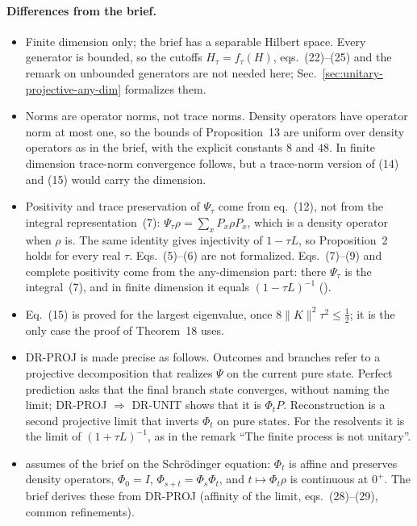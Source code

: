 \documentclass[11pt]{article}
\begin{document}
\paragraph{Differences from the brief.}
\begin{itemize}
\item Finite dimension only; the brief has a separable Hilbert space. Every generator is bounded,
  so the cutoffs $H_\tau = f_\tau(H)$, eqs.~(22)--(25) and the remark on unbounded generators are
  not needed here; Sec.~\ref{sec:unitary-projective-any-dim} formalizes them.
\item Norms are operator norms, not trace norms. Density operators have operator norm at most one,
  so the bounds of Proposition~13 are uniform over density operators as in the brief, with the
  explicit constants $8$ and $48$. In finite dimension trace-norm convergence follows, but a
  trace-norm version of (14) and (15) would carry the dimension.
\item Positivity and trace preservation of $\Psi_\tau$ come from eq.~(12), not from the integral
  representation~(7): $\Psi_\tau\rho = \sum_x P_x\rho P_x$, which is a density operator when
  $\rho$ is. The same identity gives injectivity of $1 - \tau L$, so Proposition~2 holds for
  every real $\tau$. Eqs.~(5)--(6) are not formalized. Eqs.~(7)--(9) and complete positivity come
  from the any-dimension part: there $\Psi_\tau$ is the integral~(7), and in finite dimension it
  equals $(1 - \tau L)^{-1}$ ().
\item Eq.~(15) is proved for the largest eigenvalue, once $8\|K\|^2\tau^2 \le \frac12$; it is the
  only case the proof of Theorem~18 uses.
\item DR-PROJ is made precise as follows. Outcomes and branches refer to a projective
  decomposition that realizes $\Psi$ on the current pure state. Perfect prediction asks that the
  final branch state converges, without naming the limit; DR-PROJ $\Rightarrow$ DR-UNIT shows that
  it is $\Phi_tP$. Reconstruction is a second projective limit that inverts $\Phi_t$ on pure
  states. For the resolvents it is the limit of $(1 + \tau L)^{-1}$, as in the remark ``The
  finite process is not unitary''.
\item {} assumes  of the brief on the Schr\"odinger
  equation: $\Phi_t$ is affine and preserves density operators, $\Phi_0 = I$,
  $\Phi_{s+t} = \Phi_s\Phi_t$, and $t \mapsto \Phi_t\rho$ is continuous at $0^+$. The brief
  derives these from DR-PROJ (affinity of the limit, eqs.~(28)--(29), common refinements).

\end{itemize}
\end{document}
